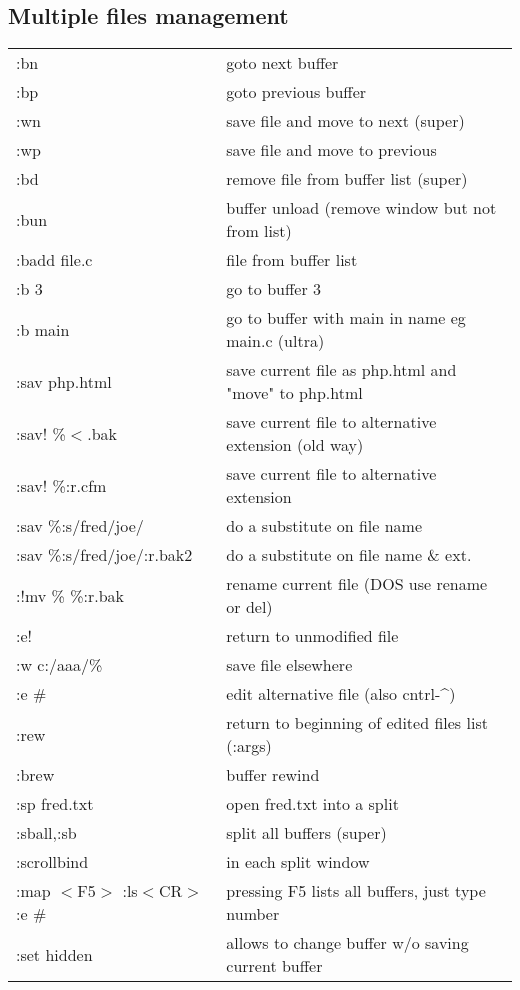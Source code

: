 \subsection{Multiple files management}
\begin{center}
\begin{longtable}{l|l}
 :bn & goto next buffer\\
 :bp & goto previous buffer\\
 :wn & save file and move to next (super)\\
 :wp & save file and move to previous\\
 :bd & remove file from buffer list (super)\\
 :bun & buffer unload (remove window but not from list)\\
 :badd file.c & file from buffer list\\
 :b 3 & go to buffer 3\\
 :b main & go to buffer with main in name eg main.c (ultra)\\
 :sav php.html & save current file as php.html and "move" to php.html\\
 :sav! \%$<$.bak & save current file to alternative extension (old way)\\
 :sav! \%:r.cfm & save current file to alternative extension\\
 :sav \%:s/fred/joe/ & do a substitute on file name\\
 :sav \%:s/fred/joe/:r.bak2 & do a substitute on file name \& ext.\\
 :!mv \% \%:r.bak & rename current file (DOS use rename or del)\\
 :e! & return to unmodified file\\
 :w c:/aaa/\% & save file elsewhere\\
 :e \# & edit alternative file (also cntrl-\^{})\\
 :rew & return to beginning of edited files list (:args)\\
 :brew & buffer rewind\\
 :sp fred.txt & open fred.txt into a split\\
 :sball,:sb & split all buffers (super)\\
 :scrollbind & in each split window\\
 :map $<$F5$>$ :ls$<$CR$>$:e \# & pressing F5 lists all buffers, just type number\\
 :set hidden & allows to change buffer w/o saving current buffer
 \end{longtable}
\end{center}

